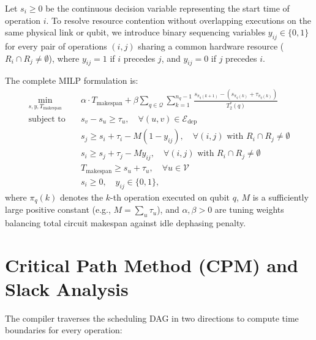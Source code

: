 Let $s_i \ge 0$ be the continuous decision variable representing the start time of operation $i$. To resolve resource contention without overlapping executions on the same physical link or qubit, we introduce binary sequencing variables $y_{ij} \in \{0, 1\}$ for every pair of operations $(i, j)$ sharing a common hardware resource ($R_i \cap R_j \neq \emptyset$), where $y_{ij} = 1$ if $i$ precedes $j$, and $y_{ij} = 0$ if $j$ precedes $i$.

The complete MILP formulation is:
\begin{align}
    \min_{s, y, T_{\text{makespan}}} \quad & \alpha \cdot T_{\text{makespan}} + \beta \sum_{q \in \mathcal{Q}} \sum_{k=1}^{n_q - 1} \frac{s_{\pi_q(k+1)} - (s_{\pi_q(k)} + \tau_{\pi_q(k)})}{T_2^*(q)} \label{eq:milp_objective} \\
    \text{subject to} \quad & s_v - s_u \ge \tau_u, \quad \forall (u, v) \in \mathcal{E}_{\text{dep}} \label{eq:milp_precedence} \\
    & s_j \ge s_i + \tau_i - M (1 - y_{ij}), \quad \forall (i, j) \text{ with } R_i \cap R_j \neq \emptyset \label{eq:milp_disjunctive_1} \\
    & s_i \ge s_j + \tau_j - M y_{ij}, \quad \forall (i, j) \text{ with } R_i \cap R_j \neq \emptyset \label{eq:milp_disjunctive_2} \\
    & T_{\text{makespan}} \ge s_u + \tau_u, \quad \forall u \in \mathcal{V} \label{eq:milp_makespan} \\
    & s_i \ge 0, \quad y_{ij} \in \{0, 1\},
\end{align}
where $\pi_q(k)$ denotes the $k$-th operation executed on qubit $q$, $M$ is a sufficiently large positive constant (e.g., $M = \sum_{u} \tau_u$), and $\alpha, \beta > 0$ are tuning weights balancing total circuit makespan against idle dephasing penalty.

\section{Critical Path Method (CPM) and Slack Analysis}
\label{sec:asap_alap}

The compiler traverses the scheduling DAG in two directions to compute time boundaries for every operation:

